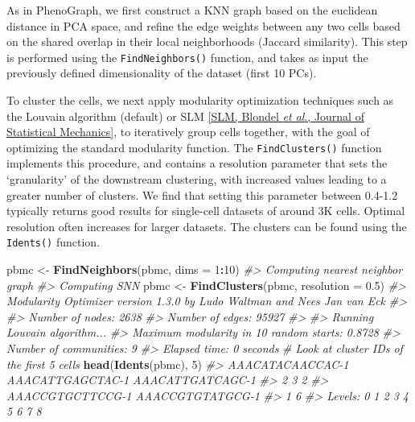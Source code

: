 \documentclass[
]{book}
\newenvironment{Shaded}{\begin{snugshade}}{\end{snugshade}}
\newcommand{\AttributeTok}[1]{\textcolor[rgb]{0.13,0.29,0.53}{#1}}
\newcommand{\CommentTok}[1]{\textcolor[rgb]{0.56,0.35,0.01}{\textit{#1}}}
\newcommand{\DecValTok}[1]{\textcolor[rgb]{0.00,0.00,0.81}{#1}}
\newcommand{\FloatTok}[1]{\textcolor[rgb]{0.00,0.00,0.81}{#1}}
\newcommand{\FunctionTok}[1]{\textcolor[rgb]{0.13,0.29,0.53}{\textbf{#1}}}
\newcommand{\NormalTok}[1]{#1}
\newcommand{\OtherTok}[1]{\textcolor[rgb]{0.56,0.35,0.01}{#1}}
\newcommand{\SpecialCharTok}[1]{\textcolor[rgb]{0.81,0.36,0.00}{\textbf{#1}}}
\begin{document}
As in PhenoGraph, we first construct a KNN graph based on the euclidean distance in PCA space, and refine the edge weights between any two cells based on the shared overlap in their local neighborhoods (Jaccard similarity). This step is performed using the \texttt{FindNeighbors()} function, and takes as input the previously defined dimensionality of the dataset (first 10 PCs).

To cluster the cells, we next apply modularity optimization techniques such as the Louvain algorithm (default) or SLM \href{http://dx.doi.org/10.1088/1742-5468/2008/10/P10008}{{[}SLM, Blondel \emph{et al}., Journal of Statistical Mechanics{]}}, to iteratively group cells together, with the goal of optimizing the standard modularity function. The \texttt{FindClusters()} function implements this procedure, and contains a resolution parameter that sets the `granularity' of the downstream clustering, with increased values leading to a greater number of clusters. We find that setting this parameter between 0.4-1.2 typically returns good results for single-cell datasets of around 3K cells. Optimal resolution often increases for larger datasets. The clusters can be found using the \texttt{Idents()} function.

\begin{Shaded}
\begin{Highlighting}[]
\NormalTok{pbmc }\OtherTok{\textless{}{-}} \FunctionTok{FindNeighbors}\NormalTok{(pbmc, }\AttributeTok{dims =} \DecValTok{1}\SpecialCharTok{:}\DecValTok{10}\NormalTok{)}
\CommentTok{\#\textgreater{} Computing nearest neighbor graph}
\CommentTok{\#\textgreater{} Computing SNN}
\NormalTok{pbmc }\OtherTok{\textless{}{-}} \FunctionTok{FindClusters}\NormalTok{(pbmc, }\AttributeTok{resolution =} \FloatTok{0.5}\NormalTok{)}
\CommentTok{\#\textgreater{} Modularity Optimizer version 1.3.0 by Ludo Waltman and Nees Jan van Eck}
\CommentTok{\#\textgreater{} }
\CommentTok{\#\textgreater{} Number of nodes: 2638}
\CommentTok{\#\textgreater{} Number of edges: 95927}
\CommentTok{\#\textgreater{} }
\CommentTok{\#\textgreater{} Running Louvain algorithm...}
\CommentTok{\#\textgreater{} Maximum modularity in 10 random starts: 0.8728}
\CommentTok{\#\textgreater{} Number of communities: 9}
\CommentTok{\#\textgreater{} Elapsed time: 0 seconds}
\CommentTok{\# Look at cluster IDs of the first 5 cells}
\FunctionTok{head}\NormalTok{(}\FunctionTok{Idents}\NormalTok{(pbmc), }\DecValTok{5}\NormalTok{)}
\CommentTok{\#\textgreater{} AAACATACAACCAC{-}1 AAACATTGAGCTAC{-}1 AAACATTGATCAGC{-}1 }
\CommentTok{\#\textgreater{}                2                3                2 }
\CommentTok{\#\textgreater{} AAACCGTGCTTCCG{-}1 AAACCGTGTATGCG{-}1 }
\CommentTok{\#\textgreater{}                1                6 }
\CommentTok{\#\textgreater{} Levels: 0 1 2 3 4 5 6 7 8}
\end{Highlighting}
\end{Shaded}
\end{document}
